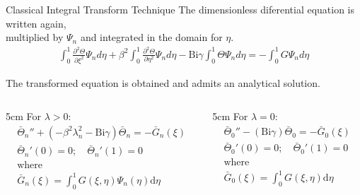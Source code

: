 \documentclass[english,landscape,xcolor=dvipsnames,aspectratio=169]{beamer}
\newcommand{\Bi}{\mathrm{Bi}}
\newcommand{\dd}{\mathrm{d}}
\begin{document}
	
\begin{frame}{Classical Integral Transform Technique}
The dimensionless diferential equation is written again, \\ 
multiplied by $\Psi_n$ and integrated in the domain for $\eta$. 
\begin{gather*}
	\int_{0}^{1}\frac{\partial ^2 \Theta}{\partial\xi ^2} \Psi_n d\eta+\beta^2\int_{0}^{1}\frac{\partial ^2 \Theta}{\partial\eta ^2}\Psi_n d\eta - \Bi\gamma\int_{0}^{1}\Theta\Psi_n d\eta=- \int_{0}^{1}G\Psi_n d\eta
\end{gather*}

The transformed equation is obtained and admits an analytical solution.
\begin{columns}[t]
\begin{column}{5cm}
	For $\lambda > 0$:
	\small
\begin{gather*}
\bar{\Theta}_n''+(-\beta^2\lambda_n^2-\Bi\gamma)\bar{\Theta}_n=-\bar{G}_n(\xi)\\
\bar{\Theta}_n'(0)=0; \quad \bar{\Theta}_n'(1)=0\\
\text{where} \\\bar{G}_n(\xi)= \int_{0}^{1}G(\xi,\eta)\Psi_n(\eta)\dd\eta
\end{gather*}
\end{column}
\begin{column}{5cm}
	 For $\lambda = 0$:
	 \small
	 \begin{gather*}
	 \bar{\Theta}_0''-(\Bi\gamma)\bar{\Theta}_0=-\bar{G}_0(\xi)\\
	 \bar{\Theta}_0'(0)=0; \quad \bar{\Theta}_0'(1)=0\\
	 \text{where}\\\bar{G}_0(\xi)= \int_{0}^{1}G(\xi,\eta)\dd\eta
	 \end{gather*}
\end{column}
\end{columns}
\end{frame}




		 
		 

		 
		 
\end{document}
